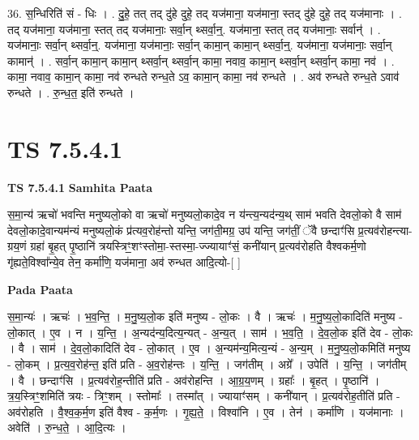 \documentclass[17pt]{extarticle}
\begin{document}
36. स॒न्धिरिति॑ सं - धिः । . दु॒हे॒ तत् तद् दु॑हे दुहे॒ तद् यज॑माना॒ यज॑माना॒ स्तद् दु॑हे दुहे॒ तद् यज॑मानाः । . तद् यज॑माना॒ यज॑माना॒ स्तत् तद् यज॑मानाः॒ सर्वा॒न् थ्सर्वा॒न्॒. यज॑माना॒ स्तत् तद् यज॑मानाः॒ सर्वान्॑ । . यज॑मानाः॒ सर्वा॒न् थ्सर्वा॒न्॒. यज॑माना॒ यज॑मानाः॒ सर्वा॒न् कामा॒न् कामा॒न् थ्सर्वा॒न्॒. यज॑माना॒ यज॑मानाः॒ सर्वा॒न् कामान्॑ । . सर्वा॒न् कामा॒न् कामा॒न् थ्सर्वा॒न् थ्सर्वा॒न् कामा॒ नवाव॒ कामा॒न् थ्सर्वा॒न् थ्सर्वा॒न् कामा॒ नव॑ । . कामा॒ नवाव॒ कामा॒न् कामा॒ नव॑ रुन्धते रुन्ध॒ते ऽव॒ कामा॒न् कामा॒ नव॑ रुन्धते । . अव॑ रुन्धते रुन्ध॒ते ऽवाव॑ रुन्धते । . रु॒न्ध॒त॒ इति॑ रुन्धते । \newline
\pagebreak
{}

\section{ TS 7.5.4.1 }

\textbf{TS 7.5.4.1 } \newline
\textbf{Samhita Paata} \newline

स॒मा॒न्य॑ ऋचो॑ भवन्ति मनुष्यलो॒को वा ऋचो॑ मनुष्यलो॒कादे॒व न य॑न्त्य॒न्यद॑न्य॒थ् साम॑ भवति देवलो॒को वै साम॑ देवलो॒कादे॒वान्यम॑न्यं मनुष्यलो॒कं प्र॑त्यव॒रोह॑न्तो यन्ति॒ जग॑ती॒मग्र॒ उप॑ यन्ति॒ जग॑तीं॒ ॅवै छन्दाꣳ॑सि प्र॒त्यव॑रोहन्त्या-ग्रय॒णं ग्रहा॑ बृ॒हत् पृ॒ष्ठानि॑ त्रयस्त्रिꣳ॒॒शꣳस्तोमा॒-स्तस्मा॒-ज्ज्यायाꣳ॑सं॒ कनी॑यान् प्र॒त्यव॑रोहति वैश्वकर्म॒णो गृ॑ह्यते॒विश्वा᳚न्ये॒व तेन॒ कर्मा॑णि॒ यज॑माना॒ अव॑ रुन्धत आदि॒त्यो-[  ] \newline

\textbf{Pada Paata} \newline

स॒मा॒न्यः॑ । ऋचः॑ । भ॒व॒न्ति॒ । म॒नु॒ष्य॒लो॒क इति॑ मनुष्य - लो॒कः । वै । ऋचः॑ । म॒नु॒ष्य॒लो॒कादिति॑ मनुष्य - लो॒कात् । ए॒व । न । य॒न्ति॒ । अ॒न्यद॑न्य॒दित्य॒न्यत् - अ॒न्य॒त् । साम॑ । भ॒व॒ति॒ । दे॒व॒लो॒क इति॑ देव - लो॒कः । वै । साम॑ । दे॒व॒लो॒कादिति॑ देव - लो॒कात् । ए॒व । अ॒न्यम॑न्य॒मित्य॒न्यं - अ॒न्य॒म् । म॒नु॒ष्य॒लो॒कमिति॑ मनुष्य - लो॒कम् । प्र॒त्य॒व॒रोह॑न्त॒ इति॑ प्रति - अ॒व॒रोह॑न्तः । य॒न्ति॒ । जग॑तीम् । अग्रे᳚ । उपेति॑ । य॒न्ति॒ । जग॑तीम् । वै । छन्दाꣳ॑सि । प्र॒त्यव॑रोह॒न्तीति॑ प्रति - अव॑रोहन्ति । आ॒ग्र॒य॒णम् । ग्रहाः᳚ । बृ॒हत् । पृ॒ष्ठानि॑ । त्र॒य॒स्त्रिꣳ॒॒शमिति॑ त्रयः - त्रिꣳ॒॒शम् । स्तोमाः᳚ । तस्मा᳚त् । ज्यायाꣳ॑सम् । कनी॑यान् । प्र॒त्यव॑रोह॒तीति॑ प्रति - अव॑रोहति । वै॒श्व॒क॒र्म॒ण इति॑ वैश्व - क॒र्म॒णः । गृ॒ह्य॒ते॒ । विश्वा॑नि । ए॒व । तेन॑ । कर्मा॑णि । यज॑मानाः । अवेति॑ । रु॒न्ध॒ते॒ । आ॒दि॒त्यः ।  \newline
\end{document}
